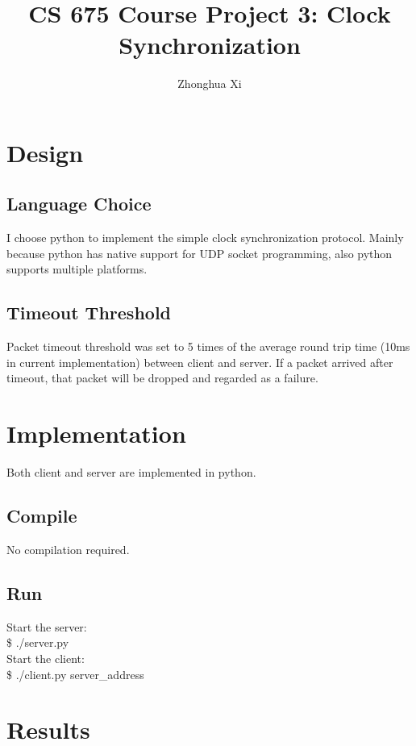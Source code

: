 \documentclass[11pt, oneside]{article}   	%
\title{CS 675 Course Project 3: Clock Synchronization}
\author{Zhonghua Xi}
\begin{document}
\maketitle

\section{Design}
\subsection{Language Choice}
I choose python to implement the simple clock synchronization protocol. Mainly because python has native support for UDP socket programming, also python supports multiple platforms.
\subsection{Timeout Threshold}
Packet timeout threshold was set to 5 times of the average round trip time (10ms in current implementation) between client and server.
If a packet arrived after timeout, that packet will be dropped and regarded as a failure.
 
\section{Implementation}
Both client and server are implemented in python.

\subsection{Compile}
No compilation required.
\subsection{Run}
Start the server: \\
\$ ./server.py \\
Start the client: \\
\$ ./client.py server\_address


\section{Results}
\end{document}

